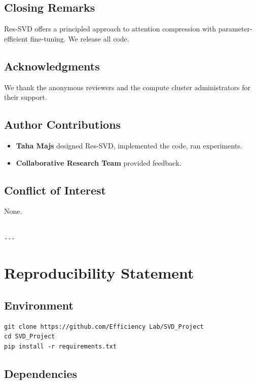 \subsection{Closing Remarks}

Res-SVD offers a principled approach to attention compression with 
parameter-efficient fine-tuning. We release all code.

\subsection{Acknowledgments}

We thank the anonymous reviewers and the compute cluster administrators for their support.

\subsection{Author Contributions}

\begin{itemize}
\item \textbf{Taha Majs} designed Res-SVD, implemented the code, ran experiments.
\item \textbf{Collaborative Research Team} provided feedback.

\end{itemize}
\subsection{Conflict of Interest}

None.
\begin{lstlisting}

---
\end{lstlisting}

\section{Reproducibility Statement}

\subsection{Environment}

\begin{lstlisting}
git clone https://github.com/Efficiency Lab/SVD_Project
cd SVD_Project
pip install -r requirements.txt
\end{lstlisting}

\subsection{Dependencies}

